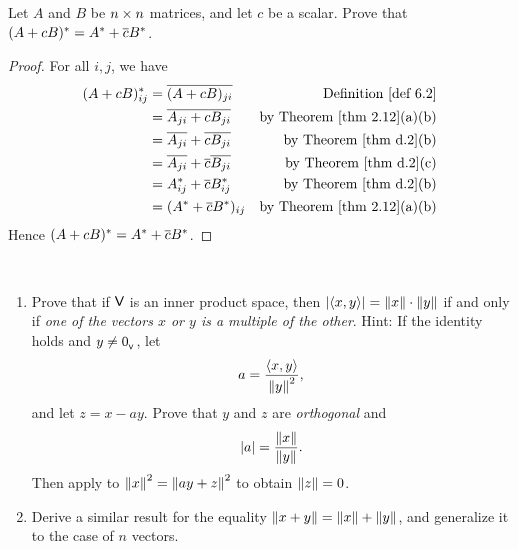 \begin{exercise} \label{exercise 6.1.14}
Let \(A\) and \(B\) be \(n \times n\) matrices, and let \(c\) be a scalar.
Prove that \((A + cB)^* = A^* + \overline{c}B^*\).
\end{exercise}

\begin{proof}
For all \(i, j\), we have
\begin{align*}
    (A + cB)^*_{ij} & = \conjugatet{(A + cB)_{ji}} & \text{\DEF{6.2}} \\
    & = \conjugatet{A_{ji} + cB_{ji}} & \text{by \THM{2.12}(a)(b)} \\
    & = \conjugatet{A_{ji}} + \conjugatet{cB_{ji}} & \text{by \THM{d.2}(b)} \\
    & = \conjugatet{A_{ji}} + \conjugatet{c}\conjugatet{B_{ji}} & \text{by \THM{d.2}(c)} \\
    & = A_{ij}^* + \conjugatet{c}B_{ij}^* & \text{by \THM{d.2}(b)} \\
    & = (A^* + \conjugatet{c}B^*)_{ij} & \text{by \THM{2.12}(a)(b)}
\end{align*}
Hence \((A + cB)^* = A^* + \overline{c}B^*\).
\end{proof}

\begin{exercise} \label{exercise 6.1.15} \ 

\begin{enumerate}
\item Prove that if \(\textsf{V}\) is an inner product space, then \(\lvert \left< x, y \right> \rvert = \left\lVert x\right\rVert \cdot \left\lVert y\right\rVert\) if and only if \emph{one of the vectors \(x\) or \(y\) is a multiple of the other}.
Hint: If the identity holds and \(y \ne 0_{_{\textsf{V}}}\), let
\[
    a = \frac{\left< x, y \right>}{\left\lVert y\right\rVert^2},
\]
and let \(z = x - ay\).
Prove that \(y\) and \(z\) are \emph{orthogonal} and
\[
    \lvert a\rvert = \frac{\left\lVert x\right\rVert}{\left\lVert y\right\rVert}.
\]
Then apply  to \(\left\lVert x\right\rVert^2 = \left\lVert ay + z\right\rVert^2\) to obtain \(\left\lVert z\right\rVert = 0\).

\item Derive a similar result for the equality \(\left\lVert x + y\right\rVert = \left\lVert x\right\rVert + \left\lVert y\right\rVert\), and generalize it to the case of \(n\) vectors.
\end{enumerate}
\end{exercise}

